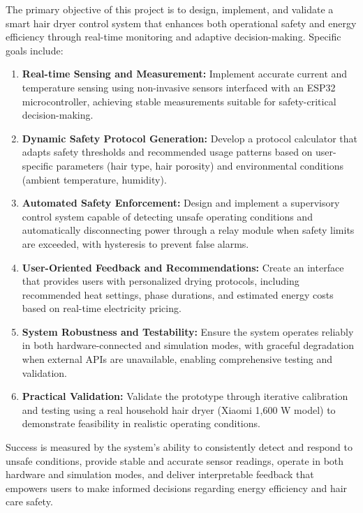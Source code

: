 \documentclass[11pt,a4paper]{article}
\begin{document}
The primary objective of this project is to design, implement, and validate a smart hair dryer control system that enhances both operational safety and energy efficiency through real-time monitoring and adaptive decision-making. Specific goals include:

\begin{enumerate}
  \item \textbf{Real-time Sensing and Measurement:} Implement accurate current and temperature sensing using non-invasive sensors interfaced with an ESP32 microcontroller, achieving stable measurements suitable for safety-critical decision-making.

  \item \textbf{Dynamic Safety Protocol Generation:} Develop a protocol calculator that adapts safety thresholds and recommended usage patterns based on user-specific parameters (hair type, hair porosity) and environmental conditions (ambient temperature, humidity).

  \item \textbf{Automated Safety Enforcement:} Design and implement a supervisory control system capable of detecting unsafe operating conditions and automatically disconnecting power through a relay module when safety limits are exceeded, with hysteresis to prevent false alarms.

  \item \textbf{User-Oriented Feedback and Recommendations:} Create an interface that provides users with personalized drying protocols, including recommended heat settings, phase durations, and estimated energy costs based on real-time electricity pricing.

  \item \textbf{System Robustness and Testability:} Ensure the system operates reliably in both hardware-connected and simulation modes, with graceful degradation when external APIs are unavailable, enabling comprehensive testing and validation.

  \item \textbf{Practical Validation:} Validate the prototype through iterative calibration and testing using a real household hair dryer (Xiaomi 1,600 W model) to demonstrate feasibility in realistic operating conditions.
\end{enumerate}

Success is measured by the system's ability to consistently detect and respond to unsafe conditions, provide stable and accurate sensor readings, operate in both hardware and simulation modes, and deliver interpretable feedback that empowers users to make informed decisions regarding energy efficiency and hair care safety.
\end{document}
